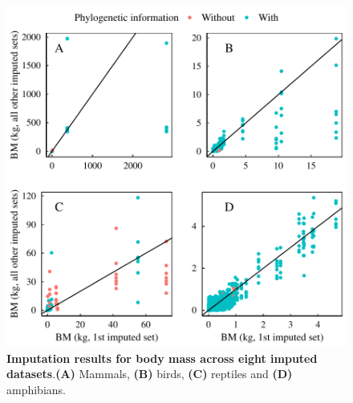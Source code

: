 \documentclass[11pt]{article}
\begin{document}
\begin{figure}[h!]
\centering
\includegraphics[scale=0.6]{figures/Congruence_continuous_traits/BM}
\caption[Imputation results for body mass across eight imputed datasets]{\textbf{Imputation results for body mass across eight imputed datasets}.\textbf{(A)} Mammals, \textbf{(B)} birds, \textbf{(C)} reptiles and \textbf{(D)} amphibians.}
\label{congruenceBM}
\end{figure}
\end{document}
